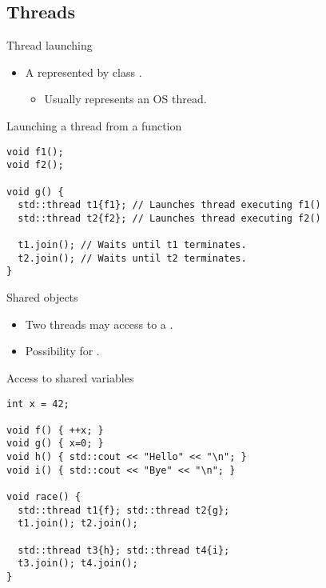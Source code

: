 \subsection{Threads}

\begin{frame}[fragile]{Thread launching}
\begin{itemize}
  \item A  represented by class .
    \begin{itemize}
      \item Usually represents an OS thread.
    \end{itemize}
\end{itemize}

\begin{block}{Launching a thread from a function}
\begin{lstlisting}
void f1();
void f2();

void g() {
  std::thread t1{f1}; // Launches thread executing f1()
  std::thread t2{f2}; // Launches thread executing f2()

  t1.join(); // Waits until t1 terminates.
  t2.join(); // Waits until t2 terminates.
}
\end{lstlisting}
\end{block}
\end{frame}


\begin{frame}[fragile]{Shared objects}
\begin{itemize}
  \item Two threads may access to a .
  \item Possibility for .
\end{itemize}

\begin{block}{Access to shared variables}
\begin{lstlisting}
int x = 42;

void f() { ++x; }
void g() { x=0; }
void h() { std::cout << "Hello" << "\n"; }
void i() { std::cout << "Bye" << "\n"; }

void race() {
  std::thread t1{f}; std::thread t2{g};
  t1.join(); t2.join();

  std::thread t3{h}; std::thread t4{i};
  t3.join(); t4.join();
}
\end{lstlisting}
\end{block}
\end{frame}

